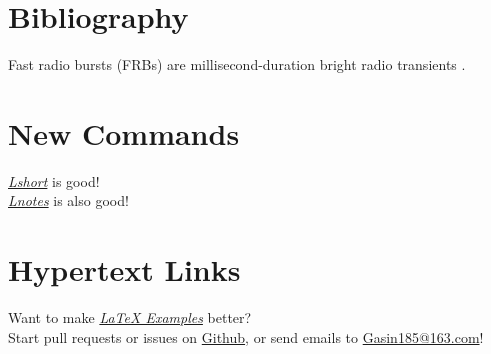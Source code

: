 \documentclass{article}
\begin{document}
    \section{Bibliography}
    Fast radio bursts (FRBs) are millisecond-duration bright radio transients
    \cite{Li2018,Lin2020}.
    
    
    \section{New Commands}
    \newcommand{\isgood}[3][good]{\href{#3}{\emph{#2}} is #1!}
    \isgood{Lshort}{https://www.ctan.org/pkg/lshort}\\
    \isgood[also good]{Lnotes}{https://github.com/huangxg/lnotes}
    \section{Hypertext Links}
    Want to make \href{lexample.pdf}{\emph{\LaTeX{} Examples}} better?\\
    Start pull requests or issues on
    \href{https://github.com/GasinAn/lexamples}{Github},
    or send emails to
    \href{mailto:Gasin185@163.com}{Gasin185@163.com}!
\end{document}

